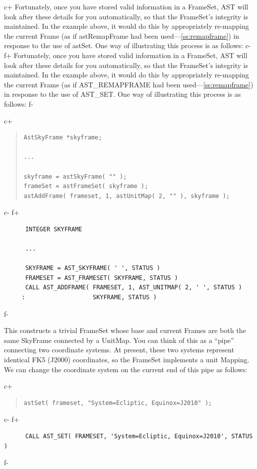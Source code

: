 \documentclass[twoside,11pt]{article}
\newcommand{\secref}[1]{\S\ref{#1}}
\renewcommand{\secref}[1]{\ref{#1}}
\begin{document}
c+
Fortunately, once you have stored valid information in a FrameSet, AST
will look after these details for you automatically, so that the
FrameSet's integrity is maintained. In the example above, it would do
this by appropriately re-mapping the current Frame (as if
astRemapFrame had been used---\secref{ss:remapframe}) in response to
the use of astSet. One way of illustrating this process is as follows:
c-
f+
Fortunately, once you have stored valid information in a FrameSet, AST
will look after these details for you automatically, so that the
FrameSet's integrity is maintained. In the example above, it would do
this by appropriately re-mapping the current Frame (as if
AST\_REMAPFRAME had been used---\secref{ss:remapframe}) in response to
the use of AST\_SET. One way of illustrating this process is as
follows:
f-

c+
\begin{quote}
\small
\begin{verbatim}
AstSkyFrame *skyframe;

...

skyframe = astSkyFrame( "" );
frameSet = astFrameSet( skyframe );
astAddFrame( frameset, 1, astUnitMap( 2, "" ), skyframe );
\end{verbatim}
\normalsize
\end{quote}
c-
f+
\small
\begin{verbatim}
      INTEGER SKYFRAME

      ...

      SKYFRAME = AST_SKYFRAME( ' ', STATUS )
      FRAMESET = AST_FRAMESET( SKYFRAME, STATUS )
      CALL AST_ADDFRAME( FRAMESET, 1, AST_UNITMAP( 2, ' ', STATUS )
     :                   SKYFRAME, STATUS )
\end{verbatim}
\normalsize
f-

This constructs a trivial FrameSet whose base and current Frames are
both the same SkyFrame connected by a UnitMap. You can think of this
as a ``pipe'' connecting two coordinate systems. At present, these two
systems represent identical FK5 (J2000) coordinates, so the FrameSet
implements a unit Mapping. We can change the coordinate system on the
current end of this pipe as follows:

c+
\begin{quote}
\small
\begin{verbatim}
astSet( frameset, "System=Ecliptic, Equinox=J2010" );
\end{verbatim}
\normalsize
\end{quote}
c-
f+
\small
\begin{verbatim}
      CALL AST_SET( FRAMESET, 'System=Ecliptic, Equinox=J2010', STATUS )
\end{verbatim}
\normalsize
f-
\end{document}
